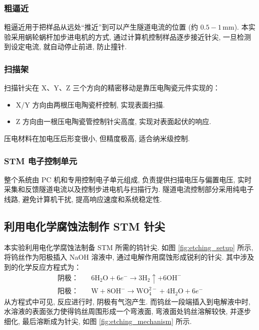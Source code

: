 \documentclass[12pt]{ctexart} %
\begin{document}
\subsubsection{粗逼近}
粗逼近用于把样品从远处“推近”到可以产生隧道电流的位置 (约 \( 0.5-1 \, \text{mm} \)). 本实验采用蜗轮蜗杆加步进电机的方式, 通过计算机控制样品逐步接近针尖, 一旦检测到设定电流, 就自动停止前进, 防止撞针.

\subsubsection{扫描架}
扫描针尖在 X、Y、Z 三个方向的精密移动是靠压电陶瓷元件实现的：
\begin{itemize}
    \item X/Y 方向由两根压电陶瓷杆控制, 实现表面扫描.
    \item Z 方向由一根压电陶瓷管控制针尖高度, 实现对表面起伏的响应.
\end{itemize}
压电材料在加电压后形变很小, 但精度极高, 适合纳米级控制.

\subsubsection{STM 电子控制单元}
整个系统由 PC 机和专用控制电子单元组成, 负责提供扫描电压与偏置电压, 实时采集和反馈隧道电流以及控制步进电机与扫描行为. 隧道电流控制部分采用纯电子线路, 避免计算机干扰, 提高响应速度和系统稳定性.

\subsection{利用电化学腐蚀法制作 STM 针尖}
本实验利用电化学腐蚀法制备 STM 所需的钨针尖. 如图 \ref{fig:etching_setup} 所示, 将钨丝作为阳极插入 NaOH 溶液中, 通过电解作用腐蚀形成锐利的针尖. 其中涉及到的化学反应方程式为：
\begin{align*} %
 \text{阴极：} \quad & 6\text{H}_2\text{O} + 6e^- \rightarrow 3\text{H}_2 \uparrow + 6\text{OH}^- \\
 \text{阳极：} \quad & \text{W} + 8\text{OH}^- \rightarrow \text{WO}_4^{2-} + 4\text{H}_2\text{O} + 6e^-
\end{align*}
从方程式中可见, 反应进行时, 阴极有气泡产生. 而钨丝一段端插入到电解液中时, 水溶液的表面张力使得钨丝周围形成一个弯液面, 弯液面处钨丝溶解较快, 并逐步细化, 最后溶断成为针尖, 如图 \ref{fig:etching_mechanism} 所示.
\end{document}
